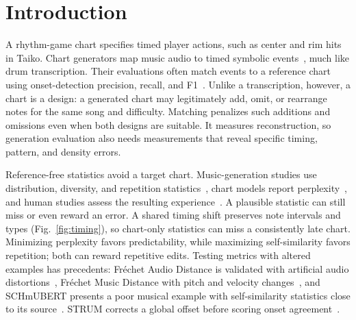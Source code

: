 \documentclass[letterpaper]{article}
\begin{document}
\section{Introduction}
\label{sec:intro}
A rhythm-game chart specifies timed player actions, such as center and rim
hits in Taiko. Chart generators map music audio to timed symbolic
events~\cite{donahue2017ddc,halina2021taikonation,
takada2023genelive,hanzen2025tcp}, much like drum transcription. Their
evaluations often match events to a
reference chart using onset-detection precision, recall, and
F1~\cite{mirevalOnset}. Unlike a transcription, however, a chart is a
design: a generated chart may legitimately add, omit, or rearrange notes for
the same song and difficulty. Matching penalizes such additions and
omissions even when both designs are suitable. It measures reconstruction,
so generation evaluation also needs measurements that reveal specific
timing, pattern, and density errors.

Reference-free statistics avoid a target chart. Music-generation studies
use distribution, diversity, and repetition
statistics~\cite{yang2020evaluation,dong2020muspy,wu2020jazz}, chart models
report perplexity~\cite{donahue2017ddc}, and human studies assess the
resulting experience~\cite{wang2024mania}. A plausible statistic can still
miss or even reward an error. A shared timing shift preserves note
intervals and types (Fig.~\ref{fig:timing}), so chart-only statistics can
miss a consistently late chart. Minimizing perplexity favors
predictability, while maximizing self-similarity favors repetition; both
can reward repetitive edits. Testing metrics with altered examples has
precedents: Fr\'echet Audio Distance is validated with artificial audio
distortions~\cite{kilgour2019fad}, Fr\'echet Music Distance with pitch and
velocity changes~\cite{retkowski2025fmd}, and SCHmUBERT presents a poor
musical example with self-similarity statistics close to its
source~\cite{plasser2023schmubert}. STRUM corrects a global offset before
scoring onset agreement~\cite{opria2026strum}.
\end{document}

